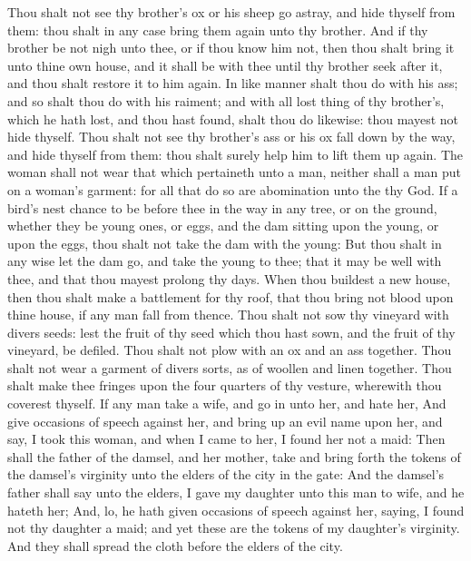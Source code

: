 \begin{biblechapter} %
\verse Thou shalt not see thy brother's ox or his sheep go astray, and hide thyself from them: thou shalt in any case bring them again unto thy brother.
\verse And if thy brother be not nigh unto thee, or if thou know him not, then thou shalt bring it unto thine own house, and it shall be with thee until thy brother seek after it, and thou shalt restore it to him again.
\verse In like manner shalt thou do with his ass; and so shalt thou do with his raiment; and with all lost thing of thy brother's, which he hath lost, and thou hast found, shalt thou do likewise: thou mayest not hide thyself.
\verse Thou shalt not see thy brother's ass or his ox fall down by the way, and hide thyself from them: thou shalt surely help him to lift them up again.
\verse The woman shall not wear that which pertaineth unto a man, neither shall a man put on a woman's garment: for all that do so are abomination unto the \LORD thy God.
\verse If a bird's nest chance to be before thee in the way in any tree, or on the ground, whether they be young ones, or eggs, and the dam sitting upon the young, or upon the eggs, thou shalt not take the dam with the young:
\verse But thou shalt in any wise let the dam go, and take the young to thee; that it may be well with thee, and that thou mayest prolong thy days.
\verse When thou buildest a new house, then thou shalt make a battlement for thy roof, that thou bring not blood upon thine house, if any man fall from thence.
\verse Thou shalt not sow thy vineyard with divers seeds: lest the fruit of thy seed which thou hast sown, and the fruit of thy vineyard, be defiled.
\verse Thou shalt not plow with an ox and an ass together.
\verse Thou shalt not wear a garment of divers sorts, as of woollen and linen together.
\verse Thou shalt make thee fringes upon the four quarters of thy vesture, wherewith thou coverest thyself.
 If any man take a wife, and go in unto her, and hate her,
\verse And give occasions of speech against her, and bring up an evil name upon her, and say, I took this woman, and when I came to her, I found her not a maid:
\verse Then shall the father of the damsel, and her mother, take and bring forth the tokens of the damsel's virginity unto the elders of the city in the gate:
\verse And the damsel's father shall say unto the elders, I gave my daughter unto this man to wife, and he hateth her;
\verse And, lo, he hath given occasions of speech against her, saying, I found not thy daughter a maid; and yet these are the tokens of my daughter's virginity. And they shall spread the cloth before the elders of the city.

\end{biblechapter}

